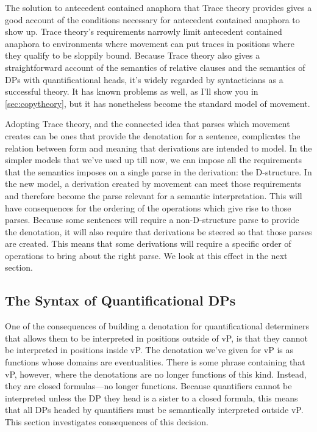 The solution to antecedent contained anaphora that Trace theory provides gives a good account of the conditions necessary for antecedent contained anaphora to show up. Trace theory's requirements narrowly limit antecedent contained anaphora to environments where movement can put traces in positions where they qualify to be sloppily bound. Because Trace theory also gives a straightforward account of the semantics of relative clauses and the semantics of DPs with quantificational heads, it's widely regarded by syntacticians as a successful theory. It has known problems as well, as I'll show you in \ref{sec:copytheory}, but it has nonetheless become the standard model of movement.

Adopting Trace theory, and the connected idea that parses which movement creates can be ones that provide the denotation for a sentence, complicates the relation between form and meaning that derivations are intended to model. In the simpler models that we've used up till now, we can impose all the requirements that the semantics imposes on a single parse in the derivation: the D-structure. In the new model, a derivation created by movement can meet those requirements and therefore become the parse relevant for a semantic interpretation. This will have consequences for the ordering of the operations which give rise to those parses. Because some sentences will require a non-D-structure parse to provide the denotation, it will also require that derivations be steered so that those parses are created. This means that some derivations will require a specific order of operations to bring about the right parse. We look at this effect in the next section.

\subsection{The Syntax of Quantificational DPs}
\label{sec:QDPs}

One of the consequences of building a denotation for quantificational determiners that allows them to be interpreted in positions outside of vP, is that they cannot be interpreted in positions inside vP. The denotation we've given for vP is as functions whose domains are eventualities. There is some phrase containing that vP, however, where the denotations are no longer functions of this kind. Instead, they are closed formulas---no longer functions. Because quantifiers cannot be interpreted unless the DP they head is a sister to a closed formula, this means that all DPs headed by quantifiers must be semantically interpreted outside vP. This section investigates consequences of this decision.

